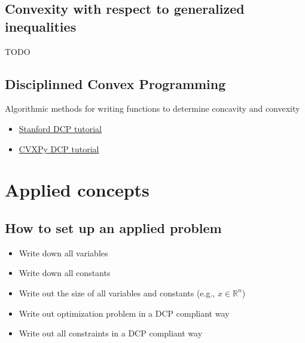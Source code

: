\documentclass{article}
\begin{document}
\subsection{Convexity with respect to generalized inequalities}
TODO

\subsection{Disciplinned Convex Programming}
Algorithmic methods for writing functions to determine concavity and convexity
\begin{itemize}
  \item \href{https://dcp.stanford.edu/}{Stanford DCP tutorial}
  \item \href{https://www.cvxpy.org/tutorial/dcp/}{CVXPy DCP tutorial}
\end{itemize}

\section{Applied concepts}
\subsection{How to set up an applied problem}
\begin{itemize}
  \item Write down all variables
  \item Write down all constants
  \item Write out the size of all variables and constants (e.g., $x\in \mathbb{R}^n$)
  \item Write out optimization problem in a DCP compliant way
  \item Write out all constraints in a DCP compliant way
\end{itemize}
\end{document}
